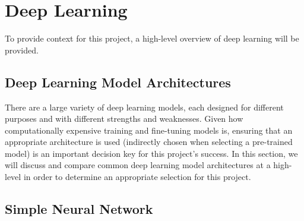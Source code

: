 
\chapter[Abbreviated title]{Deep Learning}
\label{Chap:label}	%
\pagestyle{headings}

To provide context for this project, a high-level overview of deep learning will be provided. 



\section{Deep Learning Model Architectures}

There are a large variety of deep learning models, each designed for different purposes and with
different strengths and weaknesses. Given how computationally expensive training and fine-tuning models is,
ensuring that an appropriate architecture is used (indirectly chosen when selecting a pre-trained model)
is an important decision key for this project's success. In this section, we will discuss and compare common
deep learning model architectures at a high-level in order to determine an appropriate selection for this project.

\section{Simple Neural Network}

